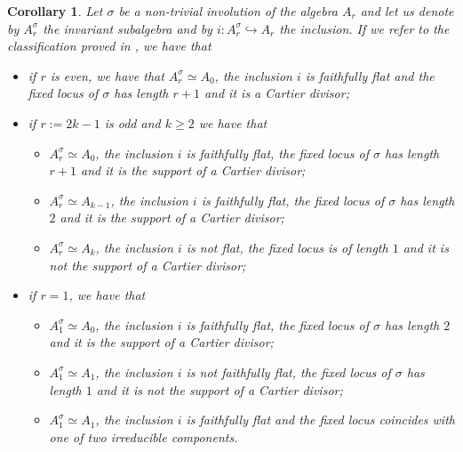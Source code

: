 \documentclass{alggeom}
\numberwithin{equation}{section}
\numberwithin{subsection}{section}
\newtheorem{corollary}[theorem]{Corollary}
\theoremstyle{definition}
\theoremstyle{remark}
\newcommand\into{\hookrightarrow}
\begin{document}
\begin{corollary}
	Let $\sigma$ be a non-trivial involution of the algebra $A_r$ and let us denote by $A_r^{\sigma}$ the invariant subalgebra and by $i:A_r^{\sigma}\into A_r$ the inclusion. If we refer to the classification proved in , we have that
	\begin{itemize}
		\item[$(a)$] if $r$ is even, we have that $A_r^{\sigma} \simeq A_0$, the inclusion $i$ is faithfully flat and the fixed locus of $\sigma$ has length $r+1$ and it is a Cartier divisor;
		\item[$(b)$] if $r:=2k-1$ is odd and $k\geq 2$ we have that 
		\begin{itemize}
			\item[$(b_1)$] $A_r^{\sigma} \simeq A_0$, the inclusion $i$ is faithfully flat, the fixed locus of $\sigma$ has length $r+1$ and it is the support of a Cartier divisor;
			\item[$(b_2)$] $A_r^{\sigma} \simeq A_{k-1}$, the inclusion $i$ is faithfully flat, the fixed locus of $\sigma$ has length $2$ and it is the support of a Cartier divisor;
			\item[$(b_3)$] $A_r^{\sigma} \simeq A_k$, the inclusion $i$ is not flat, the fixed locus is of length $1$ and it is not the support of a Cartier divisor;
		\end{itemize}
		\item[$(c)$] if $r=1$, we have that
		\begin{itemize}
			\item[$(c_1)$] $A_1^{\sigma} \simeq A_0$, the inclusion $i$ is faithfully flat, the fixed locus of $\sigma$ has length $2$ and it is the support of a Cartier divisor;
			\item[$(c_2)$] $A_1^{\sigma} \simeq A_1$, the inclusion $i$ is not faithfully flat, the fixed locus of $\sigma$ has length $1$ and it is not the support of a Cartier divisor;
			\item[$(c_3)$] $A_1^{\sigma} \simeq A_1$, the inclusion $i$ is faithfully flat and the fixed locus coincides with one of two irreducible components.
		\end{itemize}
	\end{itemize}
\end{corollary}
\end{document}
